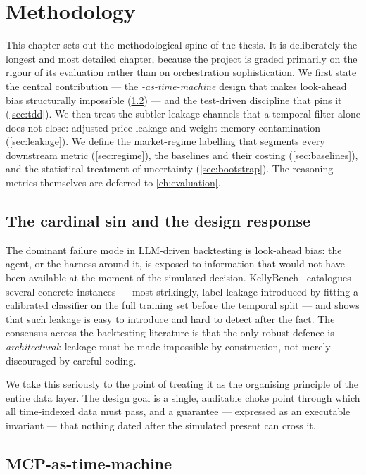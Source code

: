 \chapter{Methodology}
\label{ch:methodology}

This chapter sets out the methodological spine of the thesis. It is deliberately the
longest and most detailed chapter, because the project is graded primarily on the rigour
of its evaluation rather than on orchestration sophistication. We first state the central
contribution --- the \emph{\mcp-as-time-machine} design that makes look-ahead bias
structurally impossible (\cref{sec:timemachine}) --- and the test-driven discipline that
pins it (\cref{sec:tdd}). We then treat the subtler leakage channels that a temporal
filter alone does not close: adjusted-price leakage and weight-memory contamination
(\cref{sec:leakage}). We define the market-regime labelling that segments every downstream
metric (\cref{sec:regime}), the baselines and their costing (\cref{sec:baselines}), and the
statistical treatment of uncertainty (\cref{sec:bootstrap}). The reasoning metrics
themselves are deferred to \cref{ch:evaluation}.

\section{The cardinal sin and the design response}
\label{sec:cardinal}

The dominant failure mode in LLM-driven backtesting is look-ahead bias: the agent, or the
harness around it, is exposed to information that would not have been available at the
moment of the simulated decision. KellyBench~\cite{kellybench2026} catalogues several
concrete instances --- most strikingly, label leakage introduced by fitting a calibrated
classifier on the full training set before the temporal split --- and shows that such
leakage is easy to introduce and hard to detect after the fact. The consensus across the
backtesting literature is that the only robust defence is \emph{architectural}: leakage
must be made impossible by construction, not merely discouraged by careful coding.

We take this seriously to the point of treating it as the organising principle of the
entire data layer. The design goal is a single, auditable choke point through which all
time-indexed data must pass, and a guarantee --- expressed as an executable invariant ---
that nothing dated after the simulated present can cross it.

\section{MCP-as-time-machine}
\label{sec:timemachine}

